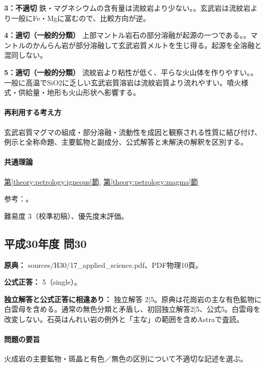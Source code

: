 \noindent\textbf{3：不適切} 鉄・マグネシウムの含有量は流紋岩より少ない。。玄武岩は流紋岩より一般にFe・Mgに富むので、比較方向が逆。\par

\noindent\textbf{4：適切（一般的分類）} 上部マントル岩石の部分溶融が起源の一つである。。マントルのかんらん岩が部分溶融して玄武岩質メルトを生じ得る。起源を全溶融と混同しない。\par

\noindent\textbf{5：適切（一般的分類）} 流紋岩より粘性が低く、平らな火山体を作りやすい。。一般に高温でSiO2に乏しい玄武岩質溶岩は流紋岩質より流れやすい。噴火様式・供給量・地形も火山形状へ影響する。\par

\paragraph{再利用する考え方} 玄武岩質マグマの組成・部分溶融・流動性を成因と観察される性質に結び付け、例示と全称命題、主要鉱物と副成分、公式解答と未解決の解釈を区別する。

\paragraph{共通理論} \hyperref[theory:petrology:igneous]{第\ref*{theory:petrology:igneous}節}, \hyperref[theory:petrology:magma]{第\ref*{theory:petrology:magma}節}

\par 参考：\cite{jma_magma1999,gsj_igneous2021}。

\par 難易度 3（校準初稿）、優先度未評価。

\subsection{平成30年度 問30}
\label{q:h30-reg-applied-30}

\noindent\textbf{原典：} sources/H30/17\_applied\_science.pdf、PDF物理10頁。

\textbf{公式正答：} 5（single）。

\par\textbf{独立解答と公式正答に相違あり：} 独立解答 2|5。原典は花崗岩の主な有色鉱物に白雲母を含める。通常の無色分類と矛盾し、初回独立解答2|5、公式5。白雲母を改変しない。石英はんれい岩の例外と「主な」の範囲を含めAstraで査読。

\paragraph{問題の要旨} 火成岩の主要鉱物・斑晶と有色／無色の区別について不適切な記述を選ぶ。

